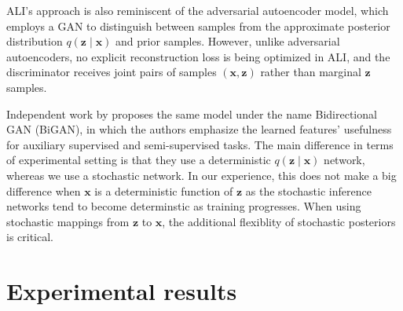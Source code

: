 \documentclass{article}
\begin{document}
ALI's approach is also reminiscent of the adversarial autoencoder model, which
employs a GAN to distinguish between samples from the approximate posterior
distribution $q(\bm{z} \mid \bm{x})$ and prior samples. However, unlike
adversarial autoencoders, no explicit reconstruction loss is being optimized in
ALI, and the discriminator receives joint pairs of samples $(\bm{x}, \bm{z})$
rather than marginal $\bm{z}$ samples.

Independent work by \citet{donahue2016adversarial} proposes the same model under
the name Bidirectional GAN (BiGAN), in which the authors emphasize the learned
features' usefulness for auxiliary supervised and semi-supervised tasks. The
main difference in terms of experimental setting is that they use a
deterministic $q(\bm{z} \mid \bm{x})$ network, whereas we use a stochastic
network. In our experience, this does not make a big difference when $\bm{x}$ is
a deterministic function of $\bm{z}$ as the stochastic inference networks tend
to become determinstic as training progresses. When using stochastic mappings
from $\bm{z}$ to $\bm{x}$, the additional flexiblity of stochastic posteriors is
critical.

\section{Experimental results}
\end{document}
